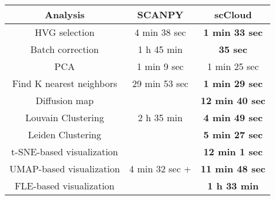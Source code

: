 \documentclass[10pt]{article}
\begin{document}
\begin{table}[H]
	\centering
	\begin{tabular}{|c|c|c|}
		\hline
		Analysis  & SCANPY & scCloud\\
		\hline \hline
		HVG selection  & 4 min 38 sec  & \textbf{1 min 33 sec}  \\
		\hline
		Batch correction  & 1 h 45 min  & \textbf{35 sec}  \\
		\hline
		PCA   & 1 min 9 sec  & 1 min 25 sec  \\
		\hline
		Find K nearest neighbors  & 29 min 53 sec  & \textbf{1 min 29 sec}  \\
		\hline
		Diffusion map   &  & \textbf{12 min 40 sec}  \\
		\hline
		Louvain Clustering  & 2 h 35 min  & \textbf{4 min 49 sec}  \\
		\hline 
		Leiden Clustering &  & \textbf{5 min 27 sec}  \\
		\hline
		t-SNE-based visualization  &  & \textbf{12 min 1 sec}  \\
		\hline
		UMAP-based visualization  & 4 min 32 sec +   & \textbf{11 min 48 sec}  \\
		\hline
		FLE-based visualization   &  & \textbf{1 h 33 min}  \\
		\hline
	\end{tabular}
\end{table}
\end{document}
